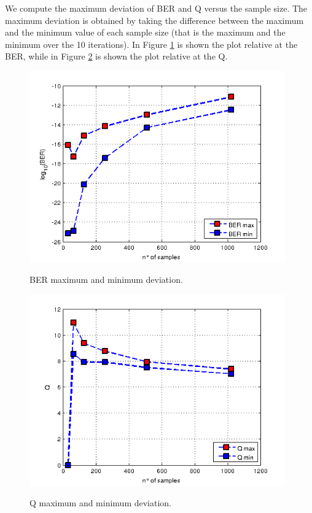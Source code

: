 \documentclass[a4paper,10pt]{report}
\begin{document}
We compute the maximum deviation of BER and Q versus the sample size.
The maximum deviation is obtained by taking the difference between the maximum and the minimum value of each sample size
(that is the maximum and the minimum over the 10 iterations).
In Figure \ref{ex4_3} is shown the plot relative at the BER, while in Figure \ref{ex4_4} is shown the plot relative at the Q.

\begin{figure}[!ht]
   \centering
   \includegraphics[width=11cm]{ex4_3.png}\\
   \caption{BER maximum and minimum deviation.}
   \label{ex4_3}
\end{figure}

\begin{figure}[!ht]
   \centering
   \includegraphics[width=11cm]{ex4_4.png}\\
   \caption{Q maximum and minimum deviation.}
   \label{ex4_4}
\end{figure}
\end{document}
